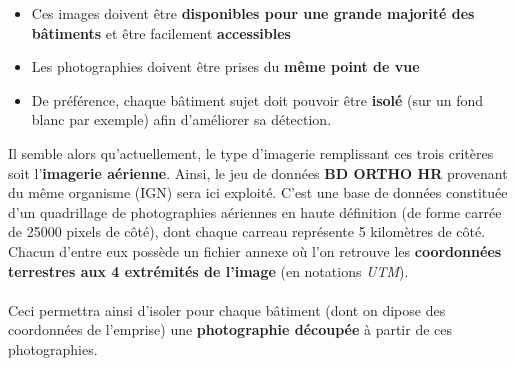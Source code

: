 \documentclass[
  11pt,
  french,
]{article}
\begin{document}
\begin{itemize}
\item
  Ces images doivent être \textbf{disponibles pour une grande majorité
  des bâtiments} et être facilement \textbf{accessibles}
\item
  Les photographies doivent être prises du \textbf{même point de vue}
\item
  De préférence, chaque bâtiment sujet doit pouvoir être \textbf{isolé}
  (sur un fond blanc par exemple) afin d'améliorer sa détection.
\end{itemize}

\hfill\break
Il semble alors qu'actuellement, le type d'imagerie remplissant ces
trois critères soit l'\textbf{imagerie aérienne}. Ainsi, le jeu de
données \textbf{BD ORTHO HR} provenant du même organisme (IGN) sera ici
exploité. C'est une base de données constituée d'un quadrillage de
photographies aériennes en haute définition (de forme carrée de 25000
pixels de côté), dont chaque carreau représente 5 kilomètres de côté.
Chacun d'entre eux possède un fichier annexe où l'on retrouve les
\textbf{coordonnées terrestres aux 4 extrémités de l'image} (en
notations \emph{UTM}).\\
~\\
Ceci permettra ainsi d'isoler pour chaque bâtiment (dont on dipose des
coordonnées de l'emprise) une \textbf{photographie découpée} à partir de
ces photographies.
\end{document}
